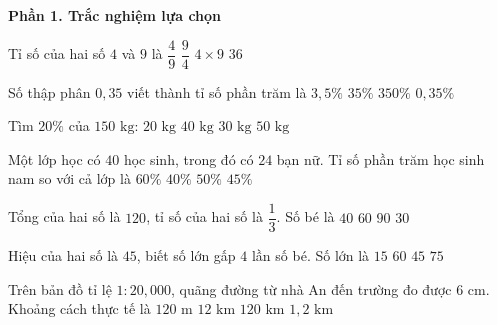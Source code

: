 \textbf{Phần 1. Trắc nghiệm lựa chọn}

\begin{ex} %
Tỉ số của hai số $4$ và $9$ là
\choice
{\True $\dfrac{4}{9}$}
{$\dfrac{9}{4}$}
{$4 \times 9$}
{$36$}
\end{ex}

\begin{ex} %
Số thập phân $0{,}35$ viết thành tỉ số phần trăm là
\choice
{$3{,}5\%$}
{\True $35\%$}
{$350\%$}
{$0{,}35\%$}
\end{ex}

\begin{ex} %
Tìm $20\%$ của $150\text{ kg}$:
\choice
{$20\text{ kg}$}
{$40\text{ kg}$}
{\True $30\text{ kg}$}
{$50\text{ kg}$}
\end{ex}

\begin{ex} %
Một lớp học có $40$ học sinh, trong đó có $24$ bạn nữ. Tỉ số phần trăm học sinh nam so với cả lớp là
\choice
{$60\%$}
{\True $40\%$}
{$50\%$}
{$45\%$}
\end{ex}

\begin{ex} %
Tổng của hai số là $120$, tỉ số của hai số là $\dfrac{1}{3}$. Số bé là
\choice
{$40$}
{$60$}
{$90$}
{\True $30$}
\end{ex}

\begin{ex} %
Hiệu của hai số là $45$, biết số lớn gấp $4$ lần số bé. Số lớn là
\choice
{$15$}
{\True $60$}
{$45$}
{$75$}
\end{ex}

\begin{ex} %
Trên bản đồ tỉ lệ $1 : 20,000$, quãng đường từ nhà An đến trường đo được $6\text{ cm}$. Khoảng cách thực tế là
\choice
{$120\text{ m}$}
{$12\text{ km}$}
{$120\text{ km}$}
{\True $1{,}2\text{ km}$}
\end{ex}


